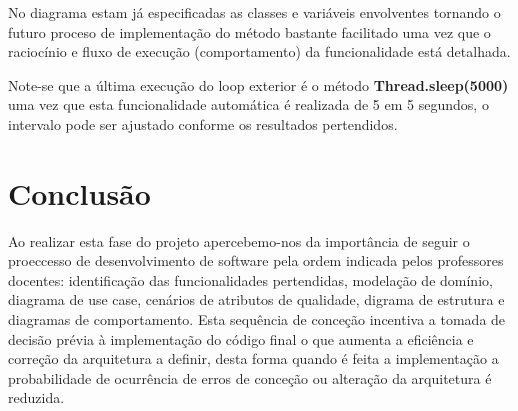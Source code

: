 \documentclass[11pt,a4paper]{report}%
\begin{document}
No diagrama estam já especificadas as classes e variáveis envolventes tornando o futuro proceso de implementação do método bastante facilitado uma vez que o raciocínio e fluxo de execução (comportamento) da funcionalidade está detalhada.

Note-se que a última execução do loop exterior é o método \textbf{Thread.sleep(5000)} uma vez que esta funcionalidade automática é realizada de 5 em 5 segundos, o intervalo pode ser ajustado conforme os resultados pertendidos.  


\newpage

\chapter{Conclusão}

Ao realizar esta fase do projeto apercebemo-nos da importância de seguir o proeccesso de desenvolvimento de software pela ordem indicada pelos professores docentes: identificação das funcionalidades pertendidas, modelação de domínio, diagrama de use case, cenários de atributos de qualidade, digrama de estrutura e diagramas de comportamento. 
Esta sequência de conceção incentiva a tomada de decisão prévia à implementação do código final o que aumenta a eficiência e correção da arquitetura a definir, desta forma quando é feita a implementação a probabilidade de ocurrência de erros de conceção ou alteração da arquitetura é reduzida. 
\end{document}
